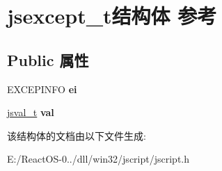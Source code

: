 \hypertarget{structjsexcept__t}{}\section{jsexcept\+\_\+t结构体 参考}
\label{structjsexcept__t}
\subsection*{Public 属性}
\begin{DoxyCompactItemize}
\item 
\mbox{\label{structjsexcept__t_accc2dad70b01adcb438ebce32e2085de}} 
E\+X\+C\+E\+P\+I\+N\+FO {\bfseries ei}
\item 
\mbox{\label{structjsexcept__t_a42eed8395ee03119ee45e0bd680e23bc}} 
\hyperlink{struct__jsval__t}{jsval\+\_\+t} {\bfseries val}
\end{DoxyCompactItemize}


该结构体的文档由以下文件生成\+:\begin{DoxyCompactItemize}
\item 
E\+:/\+React\+O\+S-\/0../dll/win32/jscript/jscript.\+h\end{DoxyCompactItemize}
